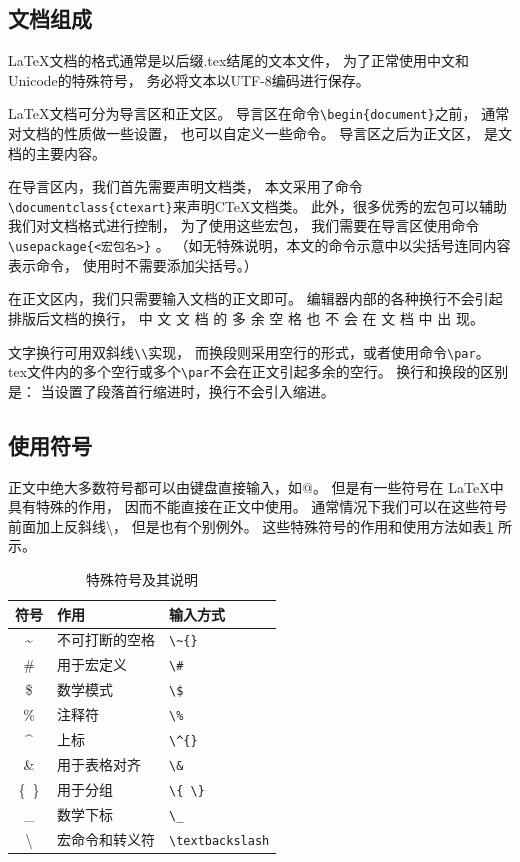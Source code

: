 \documentclass{ctexart}
\numberwithin{equation}{section}			%
\begin{document}
	\subsection{文档组成}
	\LaTeX 文档的格式通常是以后缀.tex结尾的文本文件，
	为了正常使用中文和Unicode的特殊符号，
	务必将文本以UTF-8编码进行保存。
	
	\LaTeX 文档可分为导言区和正文区。
	导言区在命令\verb|\begin{document}|之前，
	通常对文档的性质做一些设置，
	也可以自定义一些命令。
	导言区之后为正文区，
	是文档的主要内容。
	
	在导言区内，我们首先需要声明文档类，
	本文采用了命令\verb|\documentclass{ctexart}|来声明C\TeX 文档类。
	此外，很多优秀的宏包可以辅助我们对文档格式进行控制，
	为了使用这些宏包，
	我们需要在导言区使用命令\verb|\usepackage{<宏包名>}| 。
	（如无特殊说明，本文的命令示意中以尖括号连同内容表示命令，
	使用时不需要添加尖括号。）
	
	在正文区内，我们只需要输入文档的正文即可。
	编辑器内部的各种换行不会引起排版后文档的换行，
	中 文 文 档 的 多 余 空 格 也 不 会 在 文 档 中 出 现。 \par
	文字换行可用双斜线\verb|\\|实现，
	而换段则采用空行的形式，或者使用命令\verb|\par|。
	tex文件内的多个空行或多个\verb|\par|不会在正文引起多余的空行。
	换行和换段的区别是：
	当设置了段落首行缩进时，换行不会引入缩进。
	
	\subsection{使用符号}
	正文中绝大多数符号都可以由键盘直接输入，如@。
	但是有一些符号在 \LaTeX 中具有特殊的作用，
	因而不能直接在正文中使用。
	通常情况下我们可以在这些符号前面加上反斜线\textbackslash，
	但是也有个别例外。
	这些特殊符号的作用和使用方法如表\ref{tab:symbol} 所示。
	
	\begin{table}
		\centering
		\caption{特殊符号及其说明}
		\label{tab:symbol}
		\begin{tabular}{cll}
			\toprule
			符号 & 作用 & 输入方式\\
			\midrule
			\~{} & 不可打断的空格 & \verb|\~{}| \\
			\# & 用于宏定义 & \verb|\#| \\
			\$ & 数学模式 & \verb|\$| \\
			\% & 注释符 & \verb|\%| \\
			\^{} & 上标 & \verb|\^{}| \\
			\& & 用于表格对齐 & \verb|\&| \\
			\{\ \} & 用于分组 & \verb|\{ \}| \\
			\_ & 数学下标 & \verb|\_| \\
			\textbackslash & 宏命令和转义符 & \verb|\textbackslash| \\
			\bottomrule
		\end{tabular}
	\end{table}
	
\end{document}
